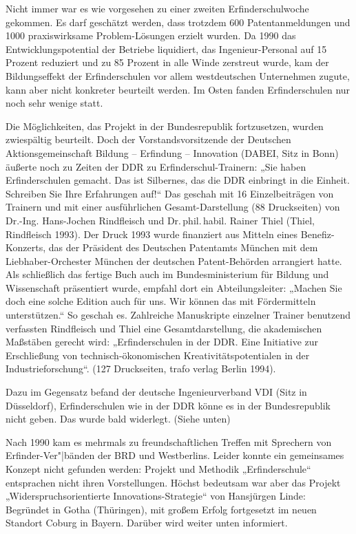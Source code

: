 \documentclass[11pt,a4paper]{article}
\begin{document}
Nicht immer war es wie vorgesehen zu einer zweiten Erfinderschulwoche gekommen.
Es darf geschätzt werden, dass trotzdem 600 Patentanmeldungen und 1000
praxiswirksame Problem-Lösungen erzielt wurden. Da 1990 das
Entwicklungspotential der Betriebe liquidiert, das Ingenieur-Personal auf 15
Prozent reduziert und zu 85 Prozent in alle Winde zerstreut wurde, kam der
Bildungseffekt der Erfinderschulen vor allem westdeutschen Unternehmen zugute,
kann aber nicht konkreter beurteilt werden. Im Osten fanden Erfinderschulen nur
noch sehr wenige statt.

Die Möglichkeiten, das Projekt in der Bundesrepublik fortzusetzen, wurden
zwiespältig beurteilt. Doch der Vorstandsvorsitzende der Deutschen
Aktionsgemeinschaft Bildung – Erfindung – Innovation (DABEI, Sitz in Bonn)
äußerte noch zu Zeiten der DDR zu Erfinderschul-Trainern: „Sie haben
Erfinderschulen gemacht. Das ist Silbernes, das die DDR einbringt in die
Einheit.  Schreiben Sie Ihre Erfahrungen auf!“ Das geschah mit 16
Einzelbeiträgen von Trainern und mit einer ausführlichen Gesamt-Darstellung
(88 Druckseiten) von Dr.-Ing. Hans-Jochen Rindfleisch und
Dr.\,phil.\,habil. Rainer Thiel (Thiel, Rindfleisch 1993).  Der Druck 1993
wurde finanziert aus Mitteln eines Benefiz-Konzerts, das der Präsident des
Deutschen Patentamts München mit dem Liebhaber-Orchester München der deutschen
Patent-Behörden arrangiert hatte. Als schließlich das fertige Buch auch im
Bundesministerium für Bildung und Wissenschaft präsentiert wurde, empfahl dort
ein Abteilungsleiter: „Machen Sie doch eine solche Edition auch für uns. Wir
können das mit Fördermitteln unterstützen.“ So geschah es.  Zahlreiche
Manuskripte einzelner Trainer benutzend verfassten Rindfleisch und Thiel eine
Gesamtdarstellung, die akademischen Maßstäben gerecht wird: „Erfinderschulen
in der DDR. Eine Initiative zur Erschließung von technisch-ökonomischen
Kreativitätspotentialen in der Industrieforschung“. (127 Druckseiten, trafo
verlag Berlin 1994).

Dazu im Gegensatz befand der deutsche Ingenieurverband VDI (Sitz in
Düsseldorf), Erfinderschulen wie in der DDR könne es in der Bundesrepublik
nicht geben. Das wurde bald widerlegt. (Siehe unten)

Nach 1990 kam es mehrmals zu freundschaftlichen Treffen mit Sprechern von
Erfinder-Ver"|bänden der BRD und Westberlins. Leider konnte ein gemeinsames
Konzept nicht gefunden werden: Projekt und Methodik „Erfinderschule“
entsprachen nicht ihren Vorstellungen. Höchst bedeutsam war aber das Projekt
„Widerspruchsorientierte Innovations-Strategie“ von Hansjürgen Linde: Begründet
in Gotha (Thüringen), mit großem Erfolg fortgesetzt im neuen Standort Coburg in
Bayern. Darüber wird weiter unten informiert.
\end{document}
